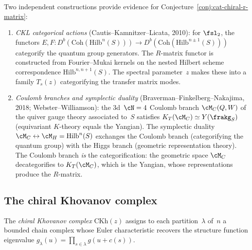 \begin{remark}
\label{rem:ckl-coulomb}
Two independent constructions provide evidence for Conjecture~\ref{conj:cat-chiral-r-matrix}:
\begin{enumerate}[label=\textup{(\alph*)}]
 \item \emph{CKL categorical actions} (Cautis--Kamnitzer--Licata, 2010): for $\fsl_2$, the functors $E, F \colon D^b(\mathrm{Coh}(\mathrm{Hilb}^n(S))) \to D^b(\mathrm{Coh}(\mathrm{Hilb}^{n \pm 1}(S)))$ categorify the quantum group generators. The $R$-matrix functor is constructed from Fourier--Mukai kernels on the nested Hilbert scheme correspondence $\mathrm{Hilb}^{n,n+1}(S)$. The spectral parameter~$z$ makes these into a family $T_s(z)$ categorifying the transfer matrix modes.
 \item \emph{Coulomb branches and symplectic duality} (Braverman--Finkelberg--Nakajima, 2018; Webster--Williamson): the $3$d~$\cN = 4$ Coulomb branch $\cM_C(Q, W)$ of the quiver gauge theory associated to~$S$ satisfies $K_T(\cM_C) \simeq Y(\frakg_S)$ (equivariant $K$-theory equals the Yangian). The symplectic duality $\cM_C \leftrightarrow \cM_H = \mathrm{Hilb}^n(S)$ exchanges the Coulomb branch (categorifying the quantum group) with the Higgs branch (geometric representation theory). The Coulomb branch \emph{is} the categorification: the geometric space $\cM_C$ decategorifies to $K_T(\cM_C)$, which is the Yangian, whose representations produce the $R$-matrix.
\end{enumerate}
\end{remark}

\subsection{The chiral Khovanov complex}
\label{subsec:chiral-khovanov-complex}

The \emph{chiral Khovanov complex} $\mathrm{CKh}(z)$ assigns to each partition~$\lambda$ of~$n$ a bounded chain complex whose Euler characteristic recovers the structure function eigenvalue $g_\lambda(u) = \prod_{s \in \lambda} g(u + c(s))$.

